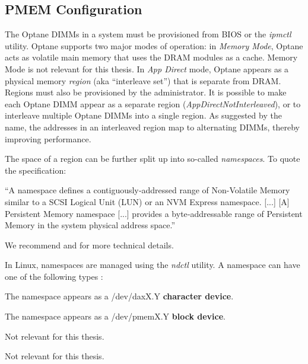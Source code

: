 \documentclass[12pt,a4paper,twoside]{book}
\begin{document}
\subsection{PMEM Configuration}\label{sec:background:pmemconfiguration}

The Optane DIMMs in a system must be provisioned from BIOS or the \textit{ipmctl} utility.
Optane supports two major modes of operation:
in \textit{Memory Mode}, Optane acts as volatile main memory that uses the DRAM modules as a cache. Memory Mode is not relevant for this thesis.
In \textit{App Direct} mode, Optane appears as a physical memory \textit{region} (aka ``interleave set'') that is separate from DRAM. %
Regions must also be provisioned by the administrator.
It is possible to make each Optane DIMM appear as a separate region (\textit{AppDirectNotInterleaved}), or to interleave multiple Optane DIMMs into a single region.
As suggested by the name, the addresses in an interleaved region map to alternating DIMMs, thereby improving performance.

The space of a region can be further split up into so-called \textit{namespaces}.
To quote the specification:
\begin{displayquote}
``A	namespace defines a contiguously­‐addressed range of Non-­Volatile Memory similar to a SCSI Logical Unit (LUN) or an NVM Express \mbox{namespace}.
[...] [A] Persistent Memory namespace [...] provides a byte­‐addressable range of Persistent Memory in the system physical address space.''~\cite{NVDIMMNamespaceSpecification2015}
\end{displayquote}
We recommend \cite{PmemIoConcepts} and \cite{NVDIMMNamespaceSpecification2015} for more technical details.

In Linux, namespaces are managed using the \textit{ndctl} utility.
A namespace can have one of the following types \cite{PmemIoConceptsNamespaces}:
\begin{description}[noitemsep,leftmargin=1.5cm,labelindent=1cm]
    \item[devdax] The namespace appears as a /dev/daxX.Y \textbf{character device}.
    \item[fsdax] The namespace appears as a /dev/pmemX.Y \textbf{block device}.
    \item[sector] Not relevant for this thesis.
    \item[raw] Not relevant for this thesis.
\end{description}
\end{document}
